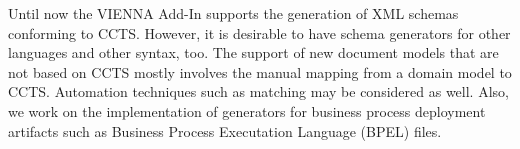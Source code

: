 \documentclass{acm_proc_article-sp}
\begin{document}
Until now the VIENNA Add-In supports the generation of XML schemas conforming to CCTS. However, it is desirable to have schema generators for other languages and other syntax, too. The support of new document models that are not based on CCTS mostly involves the manual mapping from a domain model to CCTS. Automation techniques such as matching may be considered as well. Also, we work on the implementation of generators for business process deployment artifacts such as Business Process Executation Language (BPEL) files.









  
\end{document}
